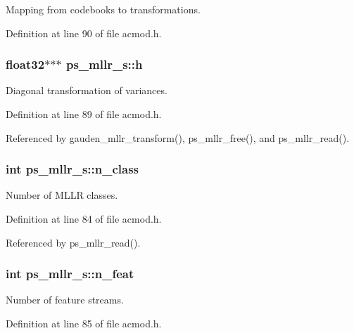 Mapping from codebooks to transformations. 



Definition at line 90 of file acmod.\+h.

\subsubsection[{h}]{\setlength{\rightskip}{0pt plus 5cm}float32$\ast$$\ast$$\ast$ ps\+\_\+mllr\+\_\+s\+::h}\label{structps__mllr__s_ae92b910e17202389aca99ee5105085b0}


Diagonal transformation of variances. 



Definition at line 89 of file acmod.\+h.



Referenced by gauden\+\_\+mllr\+\_\+transform(), ps\+\_\+mllr\+\_\+free(), and ps\+\_\+mllr\+\_\+read().

\subsubsection[{n\+\_\+class}]{\setlength{\rightskip}{0pt plus 5cm}int ps\+\_\+mllr\+\_\+s\+::n\+\_\+class}\label{structps__mllr__s_a30b9bb76c5469542d531ead4ad1bdcb1}


Number of M\+L\+L\+R classes. 



Definition at line 84 of file acmod.\+h.



Referenced by ps\+\_\+mllr\+\_\+read().

\subsubsection[{n\+\_\+feat}]{\setlength{\rightskip}{0pt plus 5cm}int ps\+\_\+mllr\+\_\+s\+::n\+\_\+feat}\label{structps__mllr__s_acc9e853a333f4e79b24f3e5af0946e43}


Number of feature streams. 



Definition at line 85 of file acmod.\+h.



